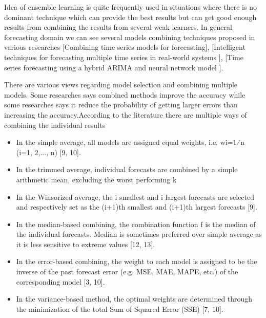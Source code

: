 Idea of ensemble learning is quite frequently used in situations where there is no dominant technique which can provide the best results but can get good enough results from combining the results from several weak learners. In general forecasting domain we can see several models combining techniques  proposed in various researches [Combining time series models for forecasting], [Intelligent techniques for forecasting multiple time series in real-world systems ],
[Time series forecasting using a hybrid ARIMA and neural network model ].  

There are various views regarding model selection and combining multiple models. Some researches says combined methods improve the accuracy while some researches says it reduce the probability of getting larger errors than increasing the accuracy.According to the literature there are multiple ways of combining the individual results 
\begin{itemize}
\item In the simple average, all models are assigned equal weights, i.e. wi=1⁄n (i=1, 2,..., n) [9, 10].
\end{itemize}
\begin{itemize}
\item In the trimmed average, individual forecasts are combined by a simple arithmetic mean, excluding the worst performing k%
\end{itemize}
\begin{itemize}
\item In the Winsorized average, the i smallest and i largest forecasts are selected and respectively set as the (i+1)th smallest and (i+1)th largest forecasts [9].
\end{itemize}
\begin{itemize}
\item In the median-based combining, the combination function f is the median of the individual forecasts. Median is sometimes preferred over simple average as it is less sensitive to extreme values [12, 13].
\end{itemize}
\begin{itemize}
\item In the error-based combining, the weight to each model is assigned to be the inverse of the past forecast error (e.g. MSE, MAE, MAPE, etc.) of the corresponding model [3, 10].
\end{itemize}
\begin{itemize}
\item In the variance-based method, the optimal weights are determined through the minimization of the total Sum of Squared Error (SSE) [7, 10].
\end{itemize}
